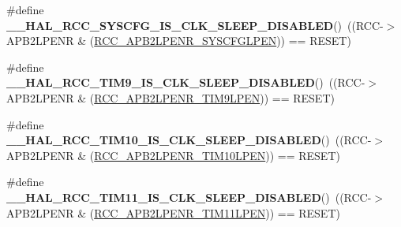 \begin{DoxyCompactItemize}
\item 
\hypertarget{group___r_c_c___a_p_b2___clock___sleep___enable___disable___status_ga564fe78887dba5a7da7da1b9f2ffb372}{\#define {\bfseries \-\_\-\-\_\-\-H\-A\-L\-\_\-\-R\-C\-C\-\_\-\-S\-Y\-S\-C\-F\-G\-\_\-\-I\-S\-\_\-\-C\-L\-K\-\_\-\-S\-L\-E\-E\-P\-\_\-\-D\-I\-S\-A\-B\-L\-E\-D}()~((R\-C\-C-\/$>$A\-P\-B2\-L\-P\-E\-N\-R \& (\hyperlink{group___peripheral___registers___bits___definition_gaaa82cfc33f0cf71220398bbe1c4b412e}{R\-C\-C\-\_\-\-A\-P\-B2\-L\-P\-E\-N\-R\-\_\-\-S\-Y\-S\-C\-F\-G\-L\-P\-E\-N})) == R\-E\-S\-E\-T)}\label{group___r_c_c___a_p_b2___clock___sleep___enable___disable___status_ga564fe78887dba5a7da7da1b9f2ffb372}

\item 
\hypertarget{group___r_c_c___a_p_b2___clock___sleep___enable___disable___status_ga8b043bd22bd1c6aa4617d37e5565f8c6}{\#define {\bfseries \-\_\-\-\_\-\-H\-A\-L\-\_\-\-R\-C\-C\-\_\-\-T\-I\-M9\-\_\-\-I\-S\-\_\-\-C\-L\-K\-\_\-\-S\-L\-E\-E\-P\-\_\-\-D\-I\-S\-A\-B\-L\-E\-D}()~((R\-C\-C-\/$>$A\-P\-B2\-L\-P\-E\-N\-R \& (\hyperlink{group___peripheral___registers___bits___definition_ga91b882f3dc2b939a53ed3f4caa537de1}{R\-C\-C\-\_\-\-A\-P\-B2\-L\-P\-E\-N\-R\-\_\-\-T\-I\-M9\-L\-P\-E\-N})) == R\-E\-S\-E\-T)}\label{group___r_c_c___a_p_b2___clock___sleep___enable___disable___status_ga8b043bd22bd1c6aa4617d37e5565f8c6}

\item 
\hypertarget{group___r_c_c___a_p_b2___clock___sleep___enable___disable___status_ga6fe0d52321bc2c97d649ddcc335bffc4}{\#define {\bfseries \-\_\-\-\_\-\-H\-A\-L\-\_\-\-R\-C\-C\-\_\-\-T\-I\-M10\-\_\-\-I\-S\-\_\-\-C\-L\-K\-\_\-\-S\-L\-E\-E\-P\-\_\-\-D\-I\-S\-A\-B\-L\-E\-D}()~((R\-C\-C-\/$>$A\-P\-B2\-L\-P\-E\-N\-R \& (\hyperlink{group___peripheral___registers___bits___definition_gae7999e2ebeb1300d0cf6a59ad92c41b6}{R\-C\-C\-\_\-\-A\-P\-B2\-L\-P\-E\-N\-R\-\_\-\-T\-I\-M10\-L\-P\-E\-N})) == R\-E\-S\-E\-T)}\label{group___r_c_c___a_p_b2___clock___sleep___enable___disable___status_ga6fe0d52321bc2c97d649ddcc335bffc4}

\item 
\hypertarget{group___r_c_c___a_p_b2___clock___sleep___enable___disable___status_gabf2f10634fa4a6a8b4957e46611d2824}{\#define {\bfseries \-\_\-\-\_\-\-H\-A\-L\-\_\-\-R\-C\-C\-\_\-\-T\-I\-M11\-\_\-\-I\-S\-\_\-\-C\-L\-K\-\_\-\-S\-L\-E\-E\-P\-\_\-\-D\-I\-S\-A\-B\-L\-E\-D}()~((R\-C\-C-\/$>$A\-P\-B2\-L\-P\-E\-N\-R \& (\hyperlink{group___peripheral___registers___bits___definition_gad43fcaa4f4d6fb2b590a6ffee31f8c94}{R\-C\-C\-\_\-\-A\-P\-B2\-L\-P\-E\-N\-R\-\_\-\-T\-I\-M11\-L\-P\-E\-N})) == R\-E\-S\-E\-T)}\label{group___r_c_c___a_p_b2___clock___sleep___enable___disable___status_gabf2f10634fa4a6a8b4957e46611d2824}


\end{DoxyCompactItemize}
